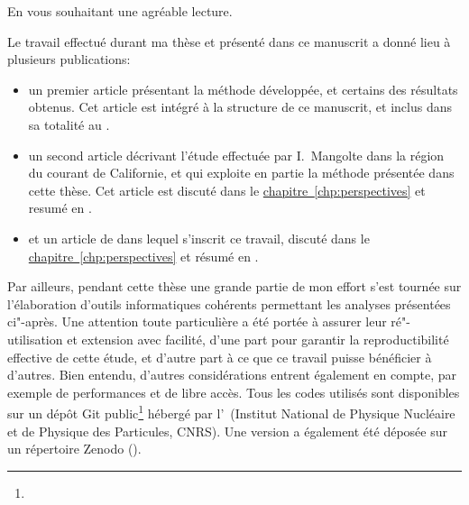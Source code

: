 En vous souhaitant une agréable lecture.

\clearpage
\thispagestyle{thesis-empty}

\label{sec:productions}

\begingroup
{}
Le travail effectué durant ma thèse et présenté dans ce manuscrit a donné lieu à plusieurs publications:
\begin{itemize}
  \setlength{\itemsep}{2\baselineskip}
  \renewcommand*\labelitemi{\adfrightarrowhead}
  \item un premier article présentant la méthode développée, et certains des résultats obtenus.
        Cet article est intégré à la structure de ce manuscrit, et inclus dans sa totalité au .

  \item un second article décrivant l'étude effectuée par I.\ Mangolte dans la région du courant de Californie, et qui exploite en partie la méthode présentée dans cette thèse. Cet article est discuté dans le \hyperref[sec:CCE]{chapitre~\ref{chp:perspectives}} et resumé en .

  \item et un article de  dans lequel s’inscrit ce travail, discuté dans le \hyperref[sec:review]{chapitre~\ref{chp:perspectives}} et résumé en .
        \textnote[title={}]{\review{\articleReviewTitle}}

\end{itemize}
\endgroup


\bigskip

Par ailleurs, pendant cette thèse une grande partie de mon effort s'est tournée sur l'élaboration d'outils informatiques cohérents  permettant les analyses présentées ci"-après.
Une attention toute particulière a été portée à assurer leur ré"-utilisation et extension avec facilité, d'une part pour garantir la reproductibilité effective de cette étude, et d'autre part à ce que ce travail puisse bénéficier à d'autres.
Bien entendu, d'autres considérations entrent également en compte, par exemple de performances et de libre accès.
Tous les codes utilisés  sont disponibles sur un dépôt Git public\footnote{} hébergé par l'~(Institut National de Physique Nucléaire et de Physique des Particules, CNRS).
Une version a également été déposée sur un répertoire Zenodo (\hbox{}).

